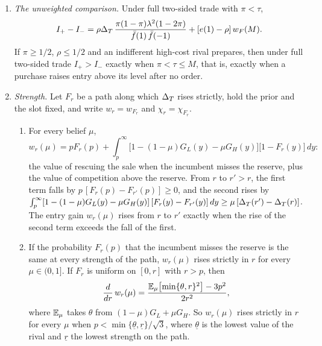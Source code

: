 \begin{proposition}
\begin{enumerate}[label=(\roman*),leftmargin=2em]
\[
P(1)-P(-1)=\rho\DT\,(M-m)+[e(1)-\rho]\,w_F(M),\qquad \rho\DT\,(M-m)=\frac{v}{\bar f(1)}\,I_-,
\]
a class component and an entry component. If the trading margin \(\rho\kappa(\pi)\DT-k\) is positive, with
\(\kappa(\pi)=\min\{m,1-M\}\), every equilibrium has full two-sided trade, under both tie rules for the informed trader, whether or not
the rival sees the price. If also \(\pi<\tau\) and the rival does not see the price, its belief stays at
\(\pi\), entry is \(\rho\) after every order, the price gap is the class component \(\rho\DT\,(M-m)\), and the
weighted impact difference is zero.
\item \emph{The unweighted comparison.} Under full two-sided trade with \(\pi<\tau\),
\[
I_+-I_-=\rho\Delta_T\,\frac{\pi(1-\pi)\lambda^2(1-2\pi)}{\bar f(1)\,\bar f(-1)}+[e(1)-\rho]\,w_F(M).
\]
If \(\pi\ge1/2\), \(\rho\le1/2\) and an indifferent high-cost rival prepares, then under full two-sided trade
\(I_+>I_-\) exactly when \(\pi<\tau\le M\), that is, exactly when a purchase raises entry above its level after no
order.
\item \emph{Strength.} Let \(F_r\) be a path along which \(\Delta_T\) rises strictly, hold the prior and the slot fixed,
and write \(w_r=w_{F_r}\) and \(\chi_r=\chi_{F_r}\).
\begin{enumerate}[label=(\alph*),leftmargin=2em]
\item For every belief \(\mu\),
\[
w_r(\mu)=pF_r(p)+\int_p^\infty\bigl[1-(1-\mu)G_L(y)-\mu G_H(y)\bigr]\bigl[1-F_r(y)\bigr]\,dy:
\]
the value of rescuing the sale when the incumbent misses the reserve, plus the value of competition above the
reserve. From \(r\) to \(r'>r\), the first term falls by \(p\,[F_r(p)-F_{r'}(p)]\ge0\), and the second rises by
\(\int_p^\infty[1-(1-\mu)G_L(y)-\mu G_H(y)]\,[F_r(y)-F_{r'}(y)]\,dy\ge\mu\,[\Delta_T(r')-\Delta_T(r)]\). The entry gain
\(w_r(\mu)\) rises from \(r\) to \(r'\) exactly when the rise of the second term exceeds the fall of the first.
\item If the probability \(F_r(p)\) that the incumbent misses the reserve is the same at every strength of the path,
\(w_r(\mu)\) rises strictly in \(r\) for every \(\mu\in(0,1]\). If \(F_r\) is uniform on \([0,r]\) with \(r>p\), then
\[
\frac{d}{dr}\,w_r(\mu)=\frac{\mathbb{E}_\mu\bigl[\min\{\theta,r\}^2\bigr]-3p^2}{2r^2},
\]
where \(\mathbb{E}_\mu\) takes \(\theta\) from \((1-\mu)G_L+\mu G_H\). So \(w_r(\mu)\) rises strictly in \(r\) for every
\(\mu\) when \(p<\min\{\underline\theta,\underline r\}/\sqrt3\), where \(\underline\theta\) is the lowest value of the rival and \(\underline r\) the lowest strength on the path.

\end{enumerate}
\end{enumerate}
\end{proposition}
